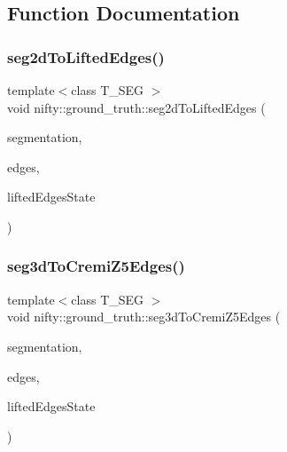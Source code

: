 \subsection{Function Documentation}
\mbox{\label{namespacenifty_1_1ground__truth_af4ff3155dceef94452c198adb989d21e}} 
\subsubsection{\texorpdfstring{seg2d\+To\+Lifted\+Edges()}{seg2dToLiftedEdges()}}
{\footnotesize\ttfamily template$<$class T\+\_\+\+S\+EG $>$ \\
void nifty\+::ground\+\_\+truth\+::seg2d\+To\+Lifted\+Edges (\begin{DoxyParamCaption}\item[{const \hyperlink{classandres_1_1View}{marray\+::\+View}$<$ T\+\_\+\+S\+EG $>$ \&}]{segmentation,  }\item[{std\+::vector$<$ std\+::array$<$ int32\+\_\+t, 2 $>$ $>$ \&}]{edges,  }\item[{\hyperlink{classandres_1_1View}{marray\+::\+View}$<$ uint8\+\_\+t $>$ \&}]{lifted\+Edges\+State }\end{DoxyParamCaption})}

\mbox{\label{namespacenifty_1_1ground__truth_a9db1e8161597359400b066deab0f7dfb}} 
\subsubsection{\texorpdfstring{seg3d\+To\+Cremi\+Z5\+Edges()}{seg3dToCremiZ5Edges()}}
{\footnotesize\ttfamily template$<$class T\+\_\+\+S\+EG $>$ \\
void nifty\+::ground\+\_\+truth\+::seg3d\+To\+Cremi\+Z5\+Edges (\begin{DoxyParamCaption}\item[{const \hyperlink{classandres_1_1View}{marray\+::\+View}$<$ T\+\_\+\+S\+EG $>$ \&}]{segmentation,  }\item[{std\+::vector$<$ std\+::array$<$ int32\+\_\+t, 4 $>$ $>$ \&}]{edges,  }\item[{\hyperlink{classandres_1_1View}{marray\+::\+View}$<$ uint8\+\_\+t $>$ \&}]{lifted\+Edges\+State }\end{DoxyParamCaption})}

